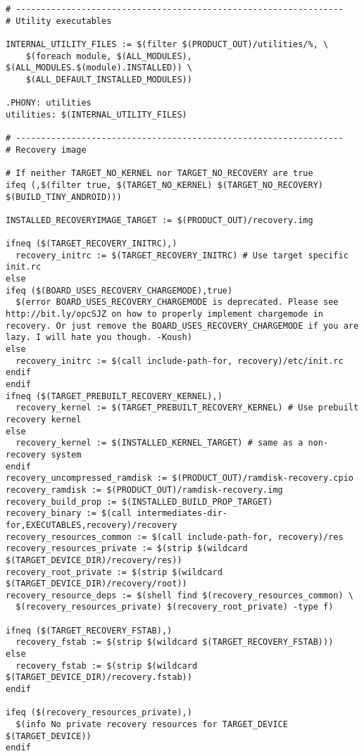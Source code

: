\documentclass[12pt,a4paper]{article}
\begin{document}
\begin{verbatim}
# -----------------------------------------------------------------
# Utility executables

INTERNAL_UTILITY_FILES := $(filter $(PRODUCT_OUT)/utilities/%, \
	$(foreach module, $(ALL_MODULES), $(ALL_MODULES.$(module).INSTALLED)) \
	$(ALL_DEFAULT_INSTALLED_MODULES))

.PHONY: utilities
utilities: $(INTERNAL_UTILITY_FILES)

# -----------------------------------------------------------------
# Recovery image

# If neither TARGET_NO_KERNEL nor TARGET_NO_RECOVERY are true
ifeq (,$(filter true, $(TARGET_NO_KERNEL) $(TARGET_NO_RECOVERY) $(BUILD_TINY_ANDROID)))

INSTALLED_RECOVERYIMAGE_TARGET := $(PRODUCT_OUT)/recovery.img

ifneq ($(TARGET_RECOVERY_INITRC),)
  recovery_initrc := $(TARGET_RECOVERY_INITRC) # Use target specific init.rc
else
ifeq ($(BOARD_USES_RECOVERY_CHARGEMODE),true)
  $(error BOARD_USES_RECOVERY_CHARGEMODE is deprecated. Please see http://bit.ly/opcSJZ on how to properly implement chargemode in recovery. Or just remove the BOARD_USES_RECOVERY_CHARGEMODE if you are lazy. I will hate you though. -Koush)
else
  recovery_initrc := $(call include-path-for, recovery)/etc/init.rc
endif
endif
ifneq ($(TARGET_PREBUILT_RECOVERY_KERNEL),)
  recovery_kernel := $(TARGET_PREBUILT_RECOVERY_KERNEL) # Use prebuilt recovery kernel
else
  recovery_kernel := $(INSTALLED_KERNEL_TARGET) # same as a non-recovery system
endif
recovery_uncompressed_ramdisk := $(PRODUCT_OUT)/ramdisk-recovery.cpio
recovery_ramdisk := $(PRODUCT_OUT)/ramdisk-recovery.img
recovery_build_prop := $(INSTALLED_BUILD_PROP_TARGET)
recovery_binary := $(call intermediates-dir-for,EXECUTABLES,recovery)/recovery
recovery_resources_common := $(call include-path-for, recovery)/res
recovery_resources_private := $(strip $(wildcard $(TARGET_DEVICE_DIR)/recovery/res))
recovery_root_private := $(strip $(wildcard $(TARGET_DEVICE_DIR)/recovery/root))
recovery_resource_deps := $(shell find $(recovery_resources_common) \
  $(recovery_resources_private) $(recovery_root_private) -type f)

ifneq ($(TARGET_RECOVERY_FSTAB),)
  recovery_fstab := $(strip $(wildcard $(TARGET_RECOVERY_FSTAB)))
else
  recovery_fstab := $(strip $(wildcard $(TARGET_DEVICE_DIR)/recovery.fstab))
endif

ifeq ($(recovery_resources_private),)
  $(info No private recovery resources for TARGET_DEVICE $(TARGET_DEVICE))
endif


\end{verbatim}
\end{document}
